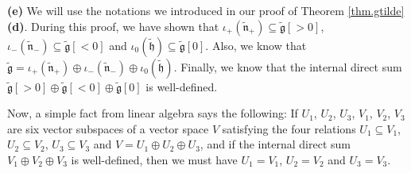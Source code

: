 \documentclass[etingof-lie.tex]{subfiles}
\begin{document}
\textbf{(e)} We will use the notations we introduced in our proof of Theorem
\ref{thm.gtilde} \textbf{(d)}. During this proof, we have shown that
$\iota_{+}\left(  \widetilde{\mathfrak{n}}_{+}\right)  \subseteq
\widetilde{\mathfrak{g}}\left[  >0\right]  $, $\iota_{-}\left(
\widetilde{\mathfrak{n}}_{-}\right)  \subseteq\widetilde{\mathfrak{g}}\left[
<0\right]  $ and $\iota_{0}\left(  \widetilde{\mathfrak{h}}\right)
\subseteq\widetilde{\mathfrak{g}}\left[  0\right]  $. Also, we know that
$\widetilde{\mathfrak{g}}=\iota_{+}\left(  \widetilde{\mathfrak{n}}%
_{+}\right)  \oplus\iota_{-}\left(  \widetilde{\mathfrak{n}}_{-}\right)
\oplus\iota_{0}\left(  \widetilde{\mathfrak{h}}\right)  $. Finally, we know
that the internal direct sum $\widetilde{\mathfrak{g}}\left[  >0\right]
\oplus\widetilde{\mathfrak{g}}\left[  <0\right]  \oplus\widetilde{\mathfrak{g}%
}\left[  0\right]  $ is well-defined.

\begin{vershort}
Now, a simple fact from linear algebra says the following: If $U_{1}$, $U_{2}%
$, $U_{3}$, $V_{1}$, $V_{2}$, $V_{3}$ are six vector subspaces of a vector
space $V$ satisfying the four relations $U_{1}\subseteq V_{1}$, $U_{2}%
\subseteq V_{2}$, $U_{3}\subseteq V_{3}$ and $V=U_{1}\oplus U_{2}\oplus U_{3}%
$, and if the internal direct sum $V_{1}\oplus V_{2}\oplus V_{3}$ is
well-defined, then we must have $U_{1}=V_{1}$, $U_{2}=V_{2}$ and $U_{3}=V_{3}$.
\end{vershort}
\end{document}
